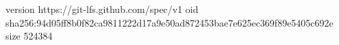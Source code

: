 version https://git-lfs.github.com/spec/v1
oid sha256:94d05ff8b0f82ca9811222d17a9e50ad872453bae7e625ec369f89e5405c692e
size 524384
